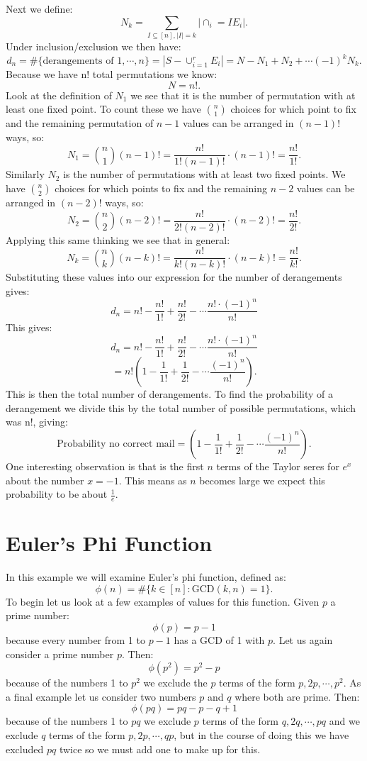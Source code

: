 \documentclass[11pt]{article}
\begin{document}
Next we define:
	\[N_k = \sum_{I \subseteq [n] , |I|=k} |\cap_i=I E_i|.\]
Under inclusion/exclusion we then have:
	\[d_n = \#\{\mbox{derangements of } 1,\cdots,n\}=|S-\cup_{i=1}^r E_i| = N - N_1 + N_2 + \cdots (-1)^k N_k.\]
Because we have n! total permutations we know:
	\[N = n! .\]
Look at the definition of $N_1$ we see that it is the number of permutation with at least one fixed point. To count these we have $n \choose 1$ choices for which point to fix and the remaining permutation of $n-1$ values can be arranged in $(n-1)!$ ways, so:
	\[N_1 = {n \choose 1} (n-1)! = \frac{n!}{1!(n-1)!}\cdot (n-1)! = \frac{n!}{1!}.\]
Similarly $N_2$ is the number of permutations with at least two fixed points. We have $n \choose 2$ choices for which points to fix and the remaining $n-2$ values can be arranged in $(n-2)!$ ways, so:
	\[N_2 = {n \choose 2} (n-2)! = \frac{n!}{2!(n-2)!}\cdot (n-2)! = \frac{n!}{2!}.\]
Applying this same thinking we see that in general:
	\[N_k = {n \choose k}(n-k)! = \frac{n!}{k!(n-k)!}\cdot (n-k)! = \frac{n!}{k!}.\]
Substituting these values into our expression for the number of derangements gives:
\[d_n = n! - \frac{n!}{1!} + \frac{n!}{2!} - \cdots \frac{n! \cdot(-1)^n}{n!}\]	
This gives:
	\[d_n = n! - \frac{n!}{1!} + \frac{n!}{2!} - \cdots \frac{n! \cdot(-1)^n}{n!}\]	
	\[=n!(1 - \frac{1}{1!} + \frac{1}{2!} - \cdots \frac{(-1)^n}{n!}) .\]
This is then the total number of derangements. To find the probability of a derangement we divide this by the total number of possible permutations, which was n!, giving:
	\[\mbox{Probability no correct mail}=(1 - \frac{1}{1!} + \frac{1}{2!} - \cdots \frac{(-1)^n}{n!}) .\]
One interesting observation is that is the first $n$ terms of the Taylor seres for $e^x$ about the number $x=-1$. This means as $n$ becomes large we expect this probability to be about $\frac{1}{e}$.

\section{Euler's Phi Function}
In this example we will examine Euler's phi function, defined as:
	\[\phi(n)=\#\{ k \in [n] : \mbox{GCD}(k,n) = 1 \}. \]
To begin let us look at a few examples of values for this function. Given $p$ a prime number:
	\[\phi(p)=p-1 \]
because every number from 1 to $p-1$ has a GCD of 1 with $p$. Let us again consider a prime number $p$. Then:
	\[\phi(p^2)=p^2-p \]
because of the numbers 1 to $p^2$ we exclude the $p$ terms of the form $p,2p,\cdots,p^2$. As a final example let us consider two numbers $p$ and $q$ where both are prime. Then:
	\[\phi(pq)=pq-p-q+1 \]
because of the numbers 1 to $pq$ we exclude $p$ terms of the form $q,2q,\cdots,pq$ and we exclude $q$ terms of the form $p,2p,\cdots,qp$, but in the course of doing this we have excluded $pq$ twice so we must add one to make up for this.
\end{document}
